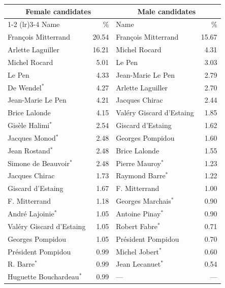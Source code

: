 \begin{tabular}{lrlr}                                     
  \toprule                                                                        
  \multicolumn{2}{c}{\textbf{Female candidates}} & \multicolumn{2}{c}{\textbf{Male
   candidates}} \\                            
  \cmidrule(lr){1-2} \cmidrule(lr){3-4}   
  Name & \% & Name & \% \\                    
  \midrule                                                                        
  François Mitterrand       & 20.54 & François Mitterrand      & 15.67 \\
  Arlette Laguiller         & 16.21 & Michel Rocard            &  4.31 \\         
  Michel Rocard             &  5.01 & Le Pen                   &  3.03 \\
  Le Pen                    &  4.33 & Jean-Marie Le Pen        &  2.79 \\         
  De Wendel$^*$       &  4.27 & Arlette Laguiller        &  2.70 \\
  Jean-Marie Le Pen         &  4.21 & Jacques Chirac           &  2.44 \\         
  Brice Lalonde             &  4.15 & Valéry Giscard d'Estaing &  1.85 \\         
  Gisèle Halimi$^*$   &  2.54 & Giscard d'Estaing        &  1.62 \\         
  Jacques Monod$^*$   &  2.48 & Georges Pompidou         &  1.60 \\         
  Jean Rostand$^*$    &  2.48 & Brice Lalonde            &  1.55 \\         
  Simone de Beauvoir$^*$ & 2.48 & Pierre Mauroy$^*$ &  1.23 \\        
  Jacques Chirac            &  1.73 & Raymond Barre$^*$  &  1.22 \\         
  Giscard d'Estaing         &  1.67 & F. Mitterrand            &  1.00 \\         
  F. Mitterrand             &  1.18 & Georges Marchais$^*$ & 0.90 \\        
  André Lajoinie$^*$  &  1.05 & Antoine Pinay$^*$  &  0.90 \\         
  Valéry Giscard d'Estaing  &  1.05 & Robert Fabre$^*$   &  0.71 \\         
  Georges Pompidou          &  1.05 & Président Pompidou       &  0.70 \\         
  Président Pompidou        &  0.99 & Michel Jobert$^*$  &  0.60 \\         
  R. Barre$^*$        &  0.99 & Jean Lecanuet$^*$  &  0.54 \\         
  Huguette Bouchardeau$^*$ & 0.99 & ---                 &    --- \\         
  \bottomrule          
\end{tabular}                                                   